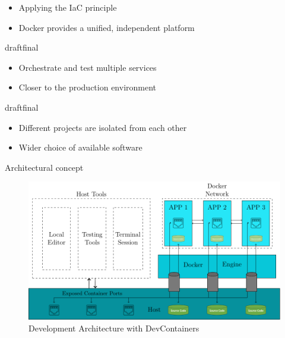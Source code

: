 \documentclass{beamer}
\def\final{final}
\def\status{draft}
\begin{document}
\begin{frame}{}
  \begin{block}{}
    \begin{itemize}
      \item Applying the IaC principle
      \item Docker provides a unified, independent platform
    \end{itemize}
  \end{block}

  \ifx\status\final{}
    \pause{}
  \fi


  \begin{block}{}
    \begin{itemize}
      \item Orchestrate and test multiple services
      \item Closer to the production environment
    \end{itemize}
  \end{block}

  \ifx\status\final{}
    \pause{}
  \fi


  \begin{block}{}
    \begin{itemize}
      \item Different projects are isolated from each other
      \item Wider choice of available software
    \end{itemize}
  \end{block}
\end{frame}

\begin{frame}{}
  \vspace{-0.2cm}
  \begin{center}
    \large Architectural concept
  \end{center}
  \vspace{-0.4cm}
  \begin{figure}
    \includegraphics[width=\textwidth]{img/concept.pdf}
    \caption{Development Architecture with DevContainers}
  \end{figure}
\end{frame}
\end{document}
